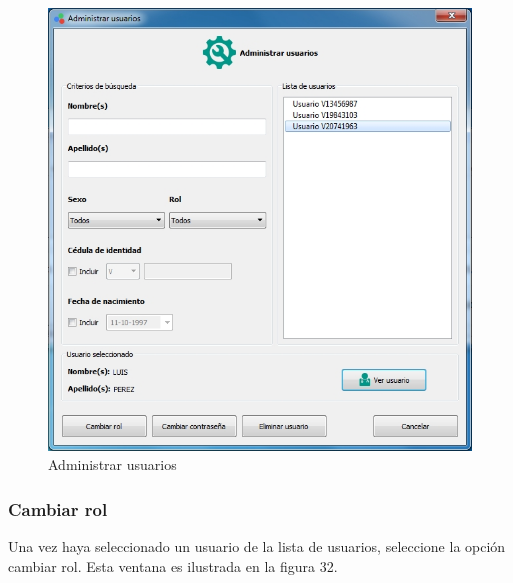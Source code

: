 \begin{figure}[H]
  \centering
  \includegraphics[width=1\linewidth]{./img/administrar-usuarios.jpg}
\caption{Administrar usuarios}
\end{figure}
	
		\subsubsection{Cambiar rol}
		
		Una vez haya seleccionado un usuario de la lista de usuarios, seleccione la opci\'{o}n cambiar rol. Esta ventana es ilustrada en la figura 32.
		
